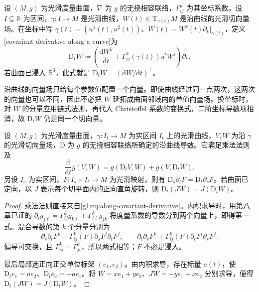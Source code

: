 \begin{definition}
	\label{g1:def:surface-along-derivative}
	设 \((M,g)\) 为光滑度量曲面，\(\nabla\) 为 \(g\) 的无挠相容联络，\(\Gamma^k_{ij}\) 为其坐标系数。设 \(I\subseteq\mathbb R\) 为区间，\(\gamma:I\rightarrow M\) 是光滑曲线，\(W(t)\in \mathrm{T}_{\gamma(t)}M\) 是沿曲线的光滑切向量场。在坐标中写 \(\gamma(t)=(u^1(t),u^2(t))\)、\(W(t)=W^k(t)\partial_k|_{\gamma(t)}\)，定义[covariant derivative along a curve]为
	\begin{equation}
		\label{g1:eq:along-covariant-derivative}
		\mathrm{D}_tW\coloneqq\left(\frac{\mathrm{d}W^k}{\mathrm{d}t}+\Gamma^k_{ij}(\gamma(t))\dot u^iW^j\right)\partial_k.
	\end{equation}
	若曲面已浸入 \(\mathbb R^3\)，此式就是 \(\mathrm{D}_tW=(\mathrm{d}W/\mathrm{d}t)^\top\)。
\end{definition}

沿曲线的向量场只给每个参数值配置一个向量。即使曲线经过同一点两次，这两次的向量也可以不同，因此不必把 \(W\) 延拓成曲面邻域内的单值向量场。换坐标时，对 \(W\) 的分量应用链式法则，再代入 Christoffel 系数的变换式，二阶坐标导数项相消，故 \(\mathrm{D}_tW\) 仍是同一个切向量。

\begin{proposition}
	\label{g1:prop:along-derivative-properties}
	设 \((M,g)\) 为光滑度量曲面，\(\gamma:I_t\to M\) 为实区间 \(I_t\) 上的光滑曲线，\(V,W\) 为沿 \(\gamma\) 的光滑切向量场，\(\mathrm D\) 为 \(g\) 的无挠相容联络所确定的沿曲线导数。它满足乘法法则及
	\[
		\frac{\mathrm{d}}{\mathrm{d}t}g(V,W)=g(\mathrm{D}_tV,W)+g(V,\mathrm{D}_tW).
	\]
	另设 \(I_s\) 为实区间，\(F:I_s\times I_t\to M\) 为光滑映射，则有 \(\mathrm{D}_s\partial_tF=\mathrm{D}_t\partial_sF\)。若曲面已定向，以 \(J\) 表示每个切平面内的正向直角旋转，则 \(\mathrm{D}_t(JW)=J(\mathrm{D}_tW)\)。
\end{proposition}

\begin{proof}
	乘法法则直接来自\eqref{g1:eq:along-covariant-derivative}。内积求导时，用第八章已证的 \(\partial_i g_{j\ell}=\Gamma^k_{ij}g_{k\ell}+\Gamma^k_{i\ell}g_{jk}\) 将度量系数的导数分到两个向量上，即得第一式。混合导数的第 \(k\) 个分量分别为
	\[
		\partial_s\partial_tF^k+\Gamma^k_{ij}(F)\partial_sF^i\partial_tF^j,
		\qquad
		\partial_t\partial_sF^k+\Gamma^k_{ij}(F)\partial_tF^i\partial_sF^j.
	\]
	偏导可交换，且 \(\Gamma^k_{ij}=\Gamma^k_{ji}\)，所以两式相等；\(F\) 不必是浸入。

	最后局部选正向正交单位标架 \((e_1,e_2)\)。由内积求导，存在标量 \(a(t)\)，使 \(\mathrm{D}_te_1=ae_2\)、\(\mathrm{D}_te_2=-ae_1\)。将 \(W=xe_1+ye_2\)、\(JW=-ye_1+xe_2\) 分别求导，便得 \(\mathrm{D}_t(JW)=J(\mathrm{D}_tW)\)。
\end{proof}

